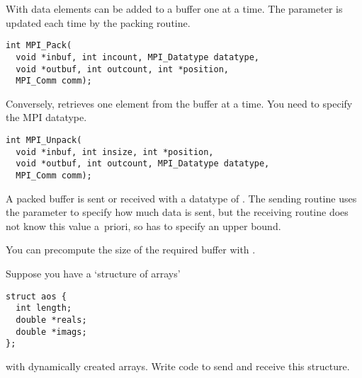 With  data elements can be added 
to a buffer one at a time. The  parameter is updated
each time by the packing routine.
\begin{lstlisting}
int MPI_Pack(
  void *inbuf, int incount, MPI_Datatype datatype,
  void *outbuf, int outcount, int *position,
  MPI_Comm comm);
\end{lstlisting}

Conversely,  retrieves one element
from the buffer at a time. You need to specify the MPI datatype.
\begin{lstlisting}
int MPI_Unpack(
  void *inbuf, int insize, int *position,
  void *outbuf, int outcount, MPI_Datatype datatype,
  MPI_Comm comm);
\end{lstlisting}

A packed buffer is sent or received with a datatype of
. The sending routine uses the 
parameter to specify how much data is sent, but the receiving routine
does not know this value a~priori, so has to specify an upper bound.


You can precompute the size of the required buffer with
%
.
%

\begin{exercise}
  \label{ex:packAOS}
  Suppose you have a `structure of arrays'
\begin{lstlisting}
struct aos {
  int length;
  double *reals;
  double *imags;
};
\end{lstlisting}
  with dynamically created arrays. Write code to send and receive this
  structure.
\end{exercise}
